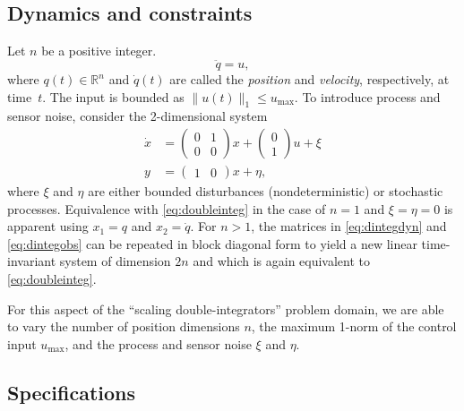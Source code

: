\documentclass[12pt]{amsart}
\theoremstyle{definition}
\begin{document}
\subsection{Dynamics and constraints}

Let $n$ be a positive integer.
\begin{equation}\label{eq:doubleinteg}
\ddot{q} = u ,
\end{equation}
where $q(t)\in \mathbb{R}^{n}$ and $\dot{q}(t)$ are called the \textit{position}
and \textit{velocity}, respectively, at time~$t$.  The input is bounded as
$\lVert u(t) \rVert_1 \leq u_{\mathrm{max}}$.  To introduce process and sensor
noise, consider the 2-dimensional system
\begin{align}
\dot{x} &= \left(
\begin{array}{cc}
0 & 1 \\
0 & 0
\end{array}
\right) x + \left(
\begin{array}{c}
0 \\
1
\end{array}
\right) u + \xi \label{eq:dintegdyn}\\
y &= \left(
\begin{array}{cc}
1 & 0
\end{array}
\right) x + \eta \label{eq:dintegobs},
\end{align}
where $\xi$ and $\eta$ are either bounded disturbances (nondeterministic) or
stochastic processes.  Equivalence with \eqref{eq:doubleinteg} in the case of
$n=1$ and $\xi=\eta=0$ is apparent using $x_1 = q$ and $x_2 = \dot{q}$.  For $n
> 1$, the matrices in \eqref{eq:dintegdyn} and \eqref{eq:dintegobs} can be
repeated in block diagonal form to yield a new linear time-invariant system of
dimension $2n$ and which is again equivalent to \eqref{eq:doubleinteg}.

For this aspect of the ``scaling double-integrators'' problem domain, we are
able to vary the number of position dimensions $n$, the maximum 1-norm of the
control input $u_{\mathrm{max}}$, and the process and sensor noise $\xi$ and
$\eta$.

\subsection{Specifications}
\end{document}
